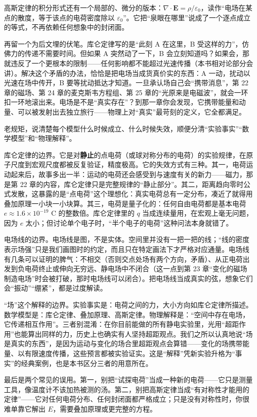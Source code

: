 \begin{challenge}
高斯定律的积分形式还有一个局部的、微分的版本：\(\nabla\cdot\mathbf E=\rho/\varepsilon_0\)，读作“电场在某点的散度，等于该点的电荷密度除以 \(\varepsilon_0\)”。它把“泉眼在哪里”说成了一个逐点成立的等式，不再依赖任何想象中的封闭面。

再留一个为后文埋的伏笔。库仑定律写的是“此刻 A 在这里，B 受这样的力”，仿佛力的传递不需要时间。但如果 A 突然动了一下，B 会立刻知道吗？如果会，那就违反了一个更根本的限制——任何影响都不能超过光速传播（本书相对论部分会讲）。解决这个矛盾的办法，恰恰是把电场当成货真价实的东西：A 一动，扰动以光速在场中传开，B 要等扰动抵达才知道。一旦承认场自己会“携带消息”，第 22 章的磁场、第 24 章的麦克斯韦方程组、第 25 章的“光原来是电磁波”，就会一环扣一环地滚出来。电场是不是“真实存在”？到那一章你会发现，它携带能量和动量、可以被发射出去独立旅行——物理上对“真实”最苛刻的定义，它全都满足。
\end{challenge}


\begin{mainline}
老规矩，说清楚每个模型什么时候成立、什么时候失效，顺便分清“实验事实”“数学模型”和“物理解释”。

库仑定律的边界。它是对\textbf{静止}的点电荷（或球对称分布的电荷）的实验规律，在原子尺度到宏观尺度都被反复验证，精度极高。它的失效方式有三种。其一，电荷运动起来后，故事多出一半：运动的电荷还会感受到与速度有关的新力——磁力，那是第 22 章的内容，库仑定律只是完整规律的“静止部分”。其二，距离趋向零时公式发散，这暴露的是“点电荷”这个理想化：真实电荷总有一定分布，凑近了就得用叠加原理一小块一小块算。其三，电荷是量子化的：任何自由电荷都是基本电荷 \(e\approx1.6\times10^{-19}\) C 的整数倍。库仑定律里的 \(q\) 当成连续量用，在宏观上毫无问题，因为 \(e\) 太小；但讨论单个电子时，“半个电子的电荷”这种问法本身就错了。

电场线的边界。电场线是图，不是实体。空间里并没有一把一把的线；“线的密度表示场强”只是我们画图时的约定，而且只在特定画法下才严格对应通量。电场线有几条可以证明的脾气：不相交（否则交点处场有两个方向，矛盾）、从正电荷出发到负电荷终止或伸向无穷远、静电场中不闭合（这一点到第 23 章“变化的磁场制造电场”时会被打破，那时电场线可以闭合）。把电场线当成真实的弦，想象它们会“振动”“绷紧”，都是过度解读。

“场”这个解释的边界。实验事实是：电荷之间的力，大小方向如库仑定律所描述。数学模型是：库仑定律、叠加原理、高斯定律。物理解释是：“空间中存在电场，它传递相互作用”。三者别混淆：在你目前能做的所有静电实验里，光用“超距作用”也能算出同样的力，历史上也确实有人坚持超距观点。我们之所以认真地说“场是真实的东西”，是因为运动与变化的场合里超距观点会算错——变化的场携带能量、以有限速度传播，这些预言都被实验证实。这是“解释”凭新实验升格为“事实”的经典案例，也是本书区分三者的用意所在。

最后是两个常见的误用。第一，别把“试探电荷”当成一种新的电荷——它只是测量工具，像温度计不该加热被测的汤。第二，别把高斯定律当成“有对称性才能用的定律”——它对任何电荷分布、任何封闭面都严格成立；只是没有对称性时，你很难单靠它解出 \(E\)，需要叠加原理或更完整的方程。
\end{mainline}

